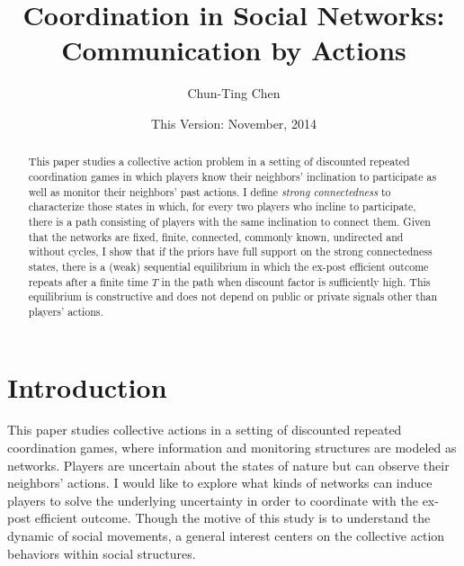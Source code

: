 \documentclass[12pt,letter]{article}
\theoremstyle{definition}
\theoremstyle{remark}
\theoremstyle{claim}
\begin{document}

\title {Coordination in Social Networks: Communication by Actions}
\author {Chun-Ting Chen}
\date{This Version: November, 2014}
\maketitle

\begin{abstract}

This paper studies a collective action problem in a setting of discounted repeated coordination games in which players know their neighbors'  inclination to participate as well as monitor their neighbors' past actions. I define \textit{strong connectedness} to characterize those states in which, for every two players who incline to participate, there is a path consisting of players with the same inclination to connect them.  Given that the networks are fixed, finite, connected, commonly known, undirected and without cycles, I show that if the priors have full support on the strong connectedness states, there is a (weak) sequential equilibrium in which the ex-post efficient outcome repeats after a finite time $T$ in the path when discount factor is sufficiently high. This equilibrium is constructive and does not depend on public or private signals other than players' actions.




\end{abstract}


\section{Introduction} 

This paper studies collective actions in a setting of discounted repeated coordination games, where information and monitoring structures are modeled as networks. Players are uncertain about the states of nature but can observe their neighbors' actions. I would like to explore what kinds of networks can induce players to solve the underlying uncertainty in order to coordinate with the ex-post efficient outcome. Though the motive of this study is to understand the dynamic of social movements, a general interest centers on the collective action behaviors within social structures.
\end{document}
